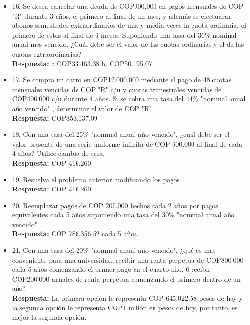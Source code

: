 \begin{itemize}
 \item 16. Se desea cancelar una deuda de COP900.000 en pagos mensuales de  COP  "R" durante 3 años, el primero al final de un mes, y además se efectuaran abonos semestrales extraordinarios de una y media veces la cuota ordinaria, el primero de estos al final de 6 meses. Suponiendo una tasa del 36\% nominal anual mes vencido. ¿Cuál debe ser el valor de las cuotas ordinarias y el de las cuotas extraordinarias?\\
       \textbf{Respuesta:} a.COP33.463.38 \hspace{0,5cm} b. COP50.195.07\\
       \medskip

 \item 17. Se compra un carro en COP12.000.000 mediante el pago de 48 cuotas mensuales vencidas de  COP "R" c/u y cuotas trimestrales vencidas de COP400.000 c/u durante 4 años. Si se cobra una tasa del 44\% "nominal anual año vencido" , determinar el valor de  COP "R".\\
       \textbf{Respuesta:} COP353.137.09\\
       \medskip

 \item 18. Con una tasa del 25\% "nominal anual año vencido", ¿cuál debe ser el valor presente de una serie uniforme infinita de COP 600.000 al final de cada 4 años? Utilice cambio de tasa.\\
       \textbf{Respuesta:} COP 416.260\\
       \medskip

 \item 19. Resuelva el problema anterior modificando los pagos\\
       \textbf{Respuesta:} COP 416.260\\
       \medskip

 \item 20. Reemplazar pagos de COP 200.000 hechos cada 2 años por pagos equivalentes cada 5 años suponiendo una tasa del 30\% "nominal anual año vencido"\\
       \textbf{Respuesta:} COP 786.356.52 cada 5 años.
       \medskip

 \item 21. Con una tasa del 20\% "nominal anual año vencido", ¿qué es más conveniente para una universidad, recibir una renta perpetua de COP800.000 cada 5 años comenzando el primer pago en el cuarto año, 0 recibir COP200.000 anuales de renta perpetua comenzando el primero dentro de un año?\\
       \textbf{Respuesta:} La primera opción le representa  COP  645.022.58 pesos de hoy y la segunda opción le representa COP1 millón en pesos de hoy, por tanto, es mejor la segunda opción.\\
       \medskip


\end{itemize}
